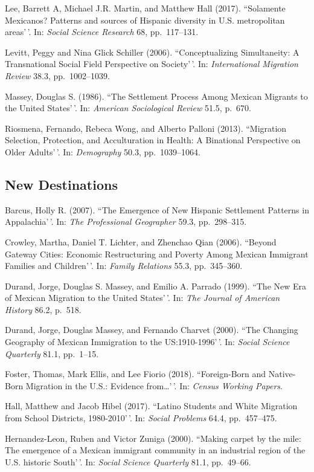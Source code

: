 \documentclass[11pt,]{article}
\begin{document}
Lee, Barrett A, Michael J.R. Martin, and Matthew Hall (2017).
``Solamente Mexicanos? Patterns and sources of Hispanic diversity in
U.S. metropolitan areas'\,'. In: \emph{Social Science Research} 68,
pp.~117--131.

Levitt, Peggy and Nina Glick Schiller (2006). ``Conceptualizing
Simultaneity: A Transnational Social Field Perspective on Society'\,'.
In: \emph{International Migration Review} 38.3, pp.~1002--1039.

Massey, Douglas S. (1986). ``The Settlement Process Among Mexican
Migrants to the United States'\,'. In:
\emph{American Sociological Review} 51.5, p.~670.

Riosmena, Fernando, Rebeca Wong, and Alberto Palloni (2013). ``Migration
Selection, Protection, and Acculturation in Health: A Binational
Perspective on Older Adults'\,'. In: \emph{Demography} 50.3,
pp.~1039--1064.

\hypertarget{new-destinations}{%
\subsection{New Destinations}\label{new-destinations}}

Barcus, Holly R. (2007). ``The Emergence of New Hispanic Settlement
Patterns in Appalachia'\,'. In: \emph{The Professional Geographer} 59.3,
pp.~298--315.

Crowley, Martha, Daniel T. Lichter, and Zhenchao Qian (2006). ``Beyond
Gateway Cities: Economic Restructuring and Poverty Among Mexican
Immigrant Families and Children'\,'. In: \emph{Family Relations} 55.3,
pp.~345--360.

Durand, Jorge, Douglas S. Massey, and Emilio A. Parrado (1999). ``The
New Era of Mexican Migration to the United States'\,'. In:
\emph{The Journal of American History} 86.2, p.~518.

Durand, Jorge, Douglas Massey, and Fernando Charvet (2000). ``The
Changing Geography of Mexican Immigration to the US:1910-1996'\,'. In:
\emph{Social Science Quarterly} 81.1, pp.~1--15.

Foster, Thomas, Mark Ellis, and Lee Fiorio (2018). ``Foreign-Born and
Native-Born Migration in the U.S.: Evidence from\ldots'\,'. In:
\emph{Census Working Papers}.

Hall, Matthew and Jacob Hibel (2017). ``Latino Students and White
Migration from School Districts, 1980-2010'\,'. In:
\emph{Social Problems} 64.4, pp.~457--475.

Hernandez-Leon, Ruben and Victor Zuniga (2000). ``Making carpet by the
mile: The emergence of a Mexican immigrant community in an industrial
region of the U.S. historic South'\,'. In:
\emph{Social Science Quarterly} 81.1, pp.~49--66.
\end{document}
